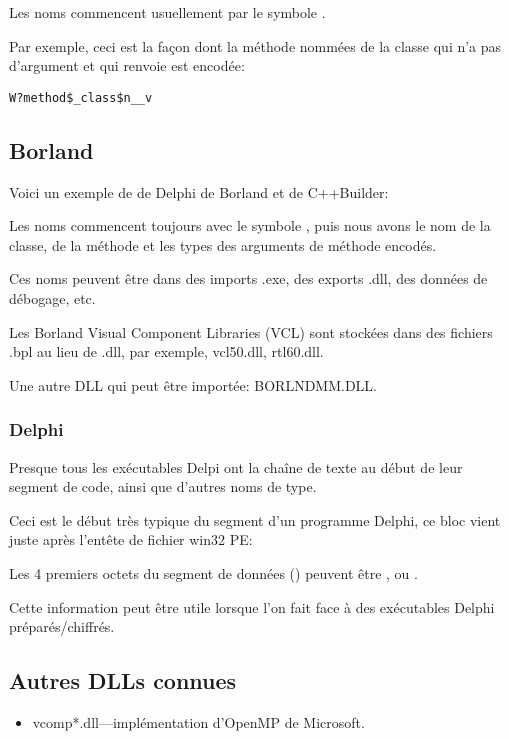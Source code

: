 Les noms commencent usuellement par le symbole .

Par exemple, ceci est la façon dont la méthode nommées  de la classe 
qui n'a pas d'argument et qui renvoie \Tvoid est encodée:

\begin{lstlisting}
W?method$_class$n__v
\end{lstlisting}

\subsection{Borland}

Voici un exemple de  de Delphi de Borland
et de C++Builder:



Les noms commencent toujours avec le symbole , puis nous avons le nom de la
classe, de la méthode et les types des arguments de méthode encodés.

Ces noms peuvent être dans des imports .exe, des exports .dll, des données de débogage,
etc.

Les Borland Visual Component Libraries (VCL) sont stockées dans des fichiers .bpl
au lieu de .dll, par exemple, vcl50.dll, rtl60.dll.

Une autre DLL qui peut être importée: BORLNDMM.DLL.

\subsubsection{Delphi}

Presque tous les exécutables Delpi ont la chaîne de texte  au début de
leur segment de code, ainsi que d'autres noms de type.

Ceci est le début très typique du segment  d'un programme Delphi, ce bloc
vient juste après l'entête de fichier win32 PE:



Les 4 premiers octets du segment de données () peuvent être ,
 ou .%

Cette information peut être utile lorsque l'on fait face à des exécutables Delphi
préparés/chiffrés.

\subsection{Autres DLLs connues}

\begin{itemize}
\item vcomp*.dll---implémentation d'OpenMP de Microsoft.
\end{itemize}

